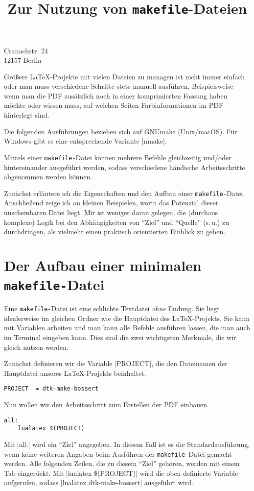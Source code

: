\documentclass[ngerman]{dtk}
\begin{document}
\title{Zur Nutzung von \texttt{makefile}-Dateien}
%
{Cranachstr. 24\\
12157 Berlin\\
}
\maketitle

Größere \LaTeX -Projekte mit vielen Dateien zu managen ist nicht immer einfach
oder man muss verschiedene Schritte stets manuell ausführen.
Beispielsweise wenn man die PDF zusätzlich noch in einer komprimierten
Fassung haben möchte oder wissen muss, auf welchen Seiten Farbinformationen im PDF
hinterlegt sind.

Die folgenden Ausführungen beziehen sich auf GNUmake (Unix/macOS).
Für Windows gibt es eine entsprechende Variante |nmake|.


Mittels einer \texttt{makefile-}Datei können mehrere Befehle gleichzeitig und/oder
hintereinander ausgeführt werden, sodass verschiedene händische Arbeitsschritte abgenommen werden können.

Zunächst erläutere ich die Eigenschaften und den Aufbau einer \texttt{makefile-}Datei.
Anschließend zeige ich an kleinen Beispielen,
worin das Potenzial dieser unscheinbaren Datei liegt.
Mir ist weniger daran gelegen,
die (durchaus komplexe) Logik bei den Abhängigkeiten von \enquote{Ziel}
und \enquote{Quelle} (s.\,u.) zu durchdringen,
als vielmehr einen praktisch orientierten Einblick zu geben.

\section{Der Aufbau einer minimalen \texttt{makefile-}Datei}
Eine \texttt{makefile-}Datei ist eine schlichte Textdatei \emph{ohne} Endung.
Sie liegt idealerweise im gleichen Ordner wie die Hauptdatei des \LaTeX -Projekts.
Sie kann mit Variablen arbeiten und man kann alle Befehle ausführen lassen,
die man auch im Terminal eingeben kann.
Dies sind die zwei wichtigsten Merkmale,
die wir gleich nutzen werden.

Zunächst definieren wir die Variable |PROJECT|,
die den Dateinamen der Hauptdatei unseres \LaTeX -Projekts beinhaltet.
\begin{lstlisting}[style=number]
PROJECT  = dtk-make-bossert
\end{lstlisting}

Nun wollen wir den Arbeitsschritt zum Erstellen der PDF einbauen.
\begin{lstlisting}[style=number]
all:
    lualatex $(PROJECT)
\end{lstlisting}
Mit |all:| wird ein \enquote{Ziel} angegeben.
In diesem Fall ist es die Standardausführung,
wenn keine weiteren Angaben beim Ausführen der
\texttt{makefile-}Datei gemacht werden.
Alle folgenden Zeilen, die zu diesem \enquote{Ziel} gehören,
werden mit einem Tab eingerückt.
Mit |lualatex \$(PROJECT)| wird die oben definierte
Variable aufgerufen, sodass |lualatex dtk-make-bossert|
ausgeführt wird.
\end{document}
